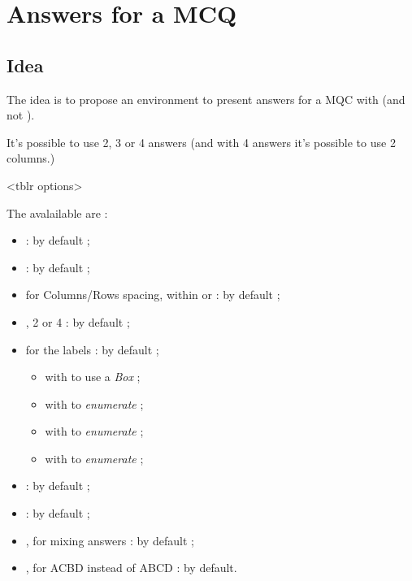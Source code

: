 \documentclass[english,11pt,a4paper]{article}
\begin{document}
\begin{codehigh}[language=latex/latex3,style/main=teal!25,style/code=teal!25]
\usepackage{customenvs}

\usepackage[option(s)]{customenvs}
\end{codehigh}

\newpage

\section{Answers for a MCQ}

\subsection{Idea}

The idea is to propose an environment to present answers for a MQC with  (and not ).

\smallskip

It's possible to use 2, 3 or 4 answers (and with 4 answers it's possible to use 2 columns.)

\begin{codehigh}[language=latex/latex3,style/main=teal!25,style/code=teal!25]
<tblr options>
\end{codehigh}

The avalailable  are :

\begin{itemize}
	\item {} :  by default ;
	\item {}  :  by default ;
	\item {} for Columns/Rows spacing, within  or  : \MontreCode{6pt/2pt} by default ;
	\item {}, 2 or 4 :  by default ;
	\item {} for the labels :  by default ;
	\begin{itemize}
		\item with  to use a \textit{Box} ;
		\item with  to \textit{enumerate}  ;
		\item with  to \textit{enumerate}  ;
		\item with  to \textit{enumerate}  ;
	\end{itemize}
	\item {} :  by default ;
	\item {} :  by default ;
	\item {}, for mixing answers :  by default ;
	\item {}, for ACBD instead of ABCD :  by default.
\end{itemize}
\end{document}
